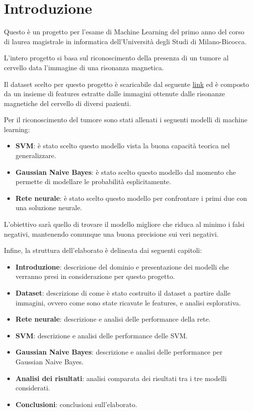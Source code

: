 \chapter{Introduzione}

Questo è un progetto per l'esame di Machine Learning del primo anno del corso 
di laurea magistrale in informatica dell'Università degli Studi di Milano-Bicocca.

L'intero progetto si basa sul riconoscimento della presenza di un tumore al cervello
data l'immagine di una risonanza magnetica.

Il dataset scelto per questo progetto è scaricabile dal seguente 
\href{https://www.kaggle.com/datasets/jakeshbohaju/brain-tumor/data}{link} ed è
composto da un insieme di features estratte dalle immagini ottenute dalle risonanze 
magnetiche del cervello di diversi pazienti.

Per il riconoscimento del tumore sono stati allenati i seguenti modelli di machine
learning:
\begin{itemize}
    \item \textbf{SVM}: è stato scelto questo modello vista la buona capacità
    teorica nel generalizzare.
    \item \textbf{Gaussian Naive Bayes}: è stato scelto questo modello dal momento
    che permette di modellare le probabilità esplicitamente.
    \item \textbf{Rete neurale}: è stato scelto questo modello per confrontare 
    i primi due con una soluzione neurale.
\end{itemize}

L'obiettivo sarà quello di trovare il modello migliore che riduca al minimo i falsi 
negativi, mantenendo comunque una buona precisione sui veri negativi.

Infine, la struttura dell'elaborato è delineata dai seguenti capitoli:
\begin{itemize}
    \item \textbf{Introduzione}: descrizione del dominio e presentazione dei modelli che 
    verranno presi in considerazione per questo progetto.
    \item \textbf{Dataset}: descrizione di come è stato costruito il dataset a partire
    dalle immagini, ovvero come sono state ricavate le features, e analisi esplorativa.
    \item \textbf{Rete neurale}: descrizione e analisi delle performance della rete.
    \item \textbf{SVM}: descrizione e analisi delle performance delle SVM.
    \item \textbf{Gaussian Naive Bayes}: descrizione e analisi delle performance 
    per Gaussian Naive Bayes.
    \item \textbf{Analisi dei risultati}: analisi comparata dei risultati tra i 
    tre modelli considerati.
    \item \textbf{Conclusioni}: conclusioni sull'elaborato.
\end{itemize}